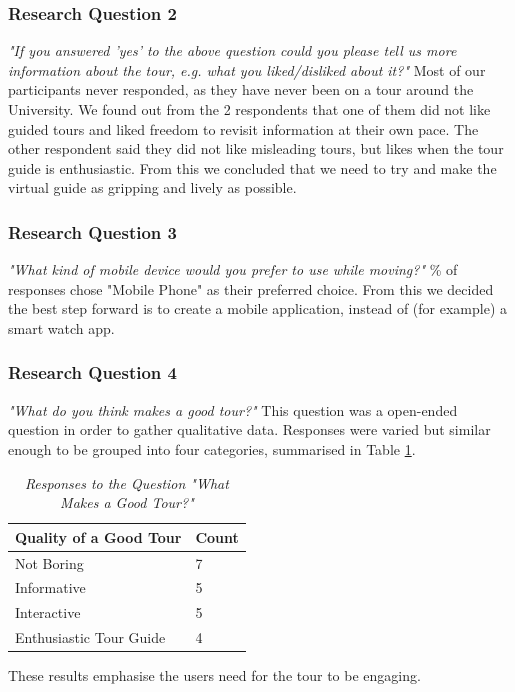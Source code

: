 \documentclass[a4,10pt,twocolumn]{article}
\begin{document}
\subsubsection{Research Question 2}
\noindent\emph{"If you answered 'yes' to the above question could you please tell us more information about the tour, e.g. what you liked/disliked about it?"}
\newline
\newline
Most of our participants never responded, as they have never been on a tour around the University. We found out from the 2 respondents that one of them did not like guided tours and liked freedom to revisit information at their own pace. The other respondent said they did not like misleading tours, but likes when the tour guide is enthusiastic. From this we concluded that we need to try and make the virtual guide as gripping and lively as possible.

\subsubsection{Research Question 3}
\noindent\emph{"What kind of mobile device would you prefer to use while moving?"}
\newline
{}\% of responses chose "Mobile Phone" as their preferred choice. From this we decided the best step forward is to create a mobile application, instead of (for example) a smart watch app.

\subsubsection{Research Question 4}
\noindent\emph{"What do you think makes a good tour?"}
\newline
\newline
This question was a open-ended question in order to gather qualitative data. Responses were varied but similar enough to be grouped into four categories, summarised in Table \ref{tab:tour}.

\begin{table}[h]
\centering
\begin{tabular}{|l|l|}
\hline
Quality of a Good Tour  & Count \\ \hline
Not Boring              & 7     \\
Informative             & 5     \\
Interactive             & 5     \\
Enthusiastic Tour Guide & 4     \\ \hline
\end{tabular}
\caption{\textit{Responses to the Question "What Makes a Good Tour?"}}
\label{tab:tour}
\end{table}
These results emphasise the users need for the tour to be engaging.
\end{document}
